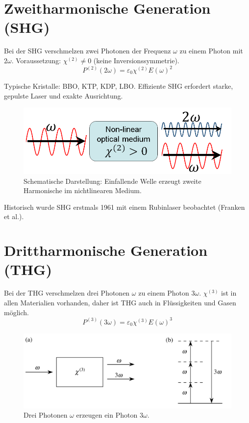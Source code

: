 \documentclass[9pt,a4paper,twocolumn,twoside]{tau-class/tau}
\begin{document}

\section{Zweitharmonische Generation (SHG)}
Bei der SHG verschmelzen zwei Photonen der Frequenz $\omega$ zu einem Photon mit $2\omega$. Voraussetzung: $\chi^{(2)} \neq 0$ (keine Inversionssymmetrie).
\begin{equation}
P^{(2)}(2\omega) = \varepsilon_0 \chi^{(2)} E(\omega)^2
\end{equation}

Typische Kristalle: BBO, KTP, KDP, LBO. Effiziente SHG erfordert starke, gepulste Laser und exakte Ausrichtung.

\begin{figure}[!ht]
\centering
\includegraphics[width=0.6\columnwidth]{../praes/Images/Schematic_of_the_SHG_conversion_of_an_excited_wave_in_a_non-linear_medium.png}
\caption{Schematische Darstellung: Einfallende Welle erzeugt zweite Harmonische im nichtlinearen Medium.\cite{BPAegirsson2017}}
\end{figure}

Historisch wurde SHG erstmals 1961 mit einem Rubinlaser beobachtet (Franken et al.).


\section{Drittharmonische Generation (THG)}
Bei der THG verschmelzen drei Photonen $\omega$ zu einem Photon $3\omega$. $\chi^{(3)}$ ist in allen Materialien vorhanden, daher ist THG auch in Flüssigkeiten und Gasen möglich.
\begin{equation}
P^{(3)}(3\omega) = \varepsilon_0 \chi^{(3)} E(\omega)^3
\end{equation}

\begin{figure}[!ht]
\centering
\includegraphics[width=0.95\columnwidth]{../praes/Images/thg.png}
\caption{Drei Photonen $\omega$ erzeugen ein Photon $3\omega$.\cite{Boyd2020}}
\end{figure}
\end{document}
